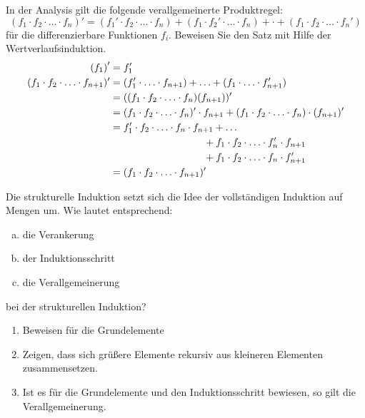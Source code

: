 \begin{card}
  In der Analysis gilt die folgende verallgemeinerte Produktregel:
  \[
  (f_1 \cdot f_2 \cdot \ldots \cdot f_n)' = (f_1' \cdot f_2 \cdot \ldots \cdot f_n) + (f_1 \cdot f_2' \cdot \ldots \cdot f_n) + \cdot + (f_1 \cdot f_2 \cdot \ldots \cdot f_n')
  \]
  für die differenzierbare Funktionen $f_i$. Beweisen Sie den Satz mit Hilfe der Wertverlaufsinduktion.
  \hr
  \begin{align*}
    \lrk f_1 \rrk ' &= f_1' \\
    (f_1 \cdot f_2 \cdot \ldots \cdot f_{n+1})' &= (f_1' \cdot \ldots \cdot f_{n+1}) + \ldots + (f_1 \cdot \ldots \cdot f_{n+1}') \\
    &= ((f_1 \cdot f_2 \cdot \ldots \cdot f_n)(f_{n+1}))' \\
    &= (f_1 \cdot f_2 \cdot \ldots \cdot f_n)' \cdot f_{n+1} + (f_1 \cdot f_2 \cdot \ldots \cdot f_n) \cdot (f_{n+1})' \\
    &= f_1' \cdot f_2 \cdot \ldots \cdot f_n \cdot f_{n+1} + \ldots \\
    & \hspace{3.3cm} + f_1 \cdot f_2 \cdot \ldots \cdot f_n' \cdot f_{n+1} \\
    & \hspace{3.3cm} + f_1 \cdot f_2 \cdot \ldots \cdot f_n \cdot f_{n+1}' \\
    &= (f_1 \cdot f_2 \cdot \ldots \cdot f_{n+1})' \\
  \end{align*}
\end{card}

\begin{card}
	Die strukturelle Induktion setzt sich die Idee der vollständigen Induktion auf Mengen um. Wie lautet entsprechend:
  \begin{enumerate}[a)]
	  \item die Verankerung
	  \item der Induktionsschritt
	  \item die Verallgemeinerung
	\end{enumerate}
	bei der strukturellen Induktion?
	\hr
	\begin{enumerate}
	  \item Beweisen für die Grundelemente
	  \item Zeigen, dass sich grüßere Elemente rekursiv aus kleineren Elementen zusammensetzen.
	  \item Ist es für die Grundelemente und den Induktionsschritt bewiesen, so gilt die Verallgemeinerung.
	\end{enumerate}
\end{card}

